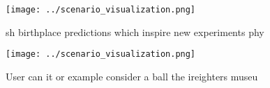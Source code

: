 \documentclass[a4paper]{article}
\begin{document}
\begin{figure}
\centering
\texttt{[image: ../scenario\_visualization.png]}
\caption{sh birthplace predictions which inspire new experiments phy
}
\end{figure}
 
\begin{figure}
\centering
\texttt{[image: ../scenario\_visualization.png]}
\caption{User can it or example consider a ball the ireighters museu
}
\end{figure}
 
\end{document}
